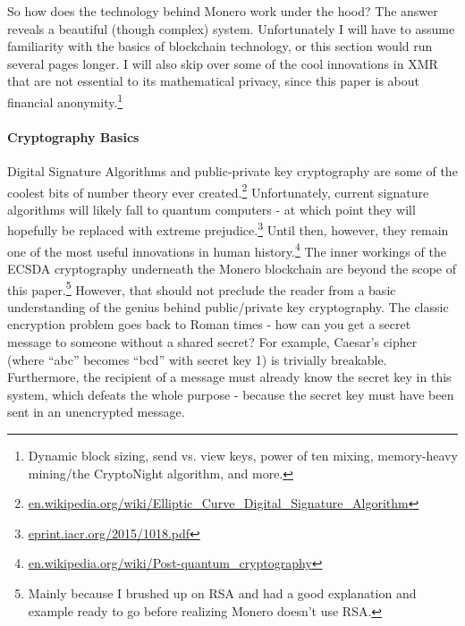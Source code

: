 \documentclass[12pt]{article}
\begin{document}



So how does the technology behind Monero work under the hood? The answer reveals a beautiful (though complex) system. Unfortunately I will have to assume familiarity with the basics of blockchain technology, or this section would run several pages longer. I will also skip over some of the cool innovations in XMR that are not essential to its mathematical privacy, since this paper is about financial anonymity.\footnote{Dynamic block sizing, send vs. view keys, power of ten mixing, memory-heavy mining/the CryptoNight algorithm, and more.}

\paragraph{Cryptography Basics} Digital Signature Algorithms and public-private key cryptography are some of the coolest bits of number theory ever created.\footnote{\url{en.wikipedia.org/wiki/Elliptic_Curve_Digital_Signature_Algorithm}} Unfortunately, current signature algorithms will likely fall to quantum computers - at which point they will hopefully be replaced with extreme 
prejudice.\footnote{\url{eprint.iacr.org/2015/1018.pdf}} Until then, however, they remain one of the most useful innovations in human 
history.\footnote{\url{en.wikipedia.org/wiki/Post-quantum_cryptography}}
The inner workings of the ECSDA cryptography underneath the Monero blockchain are beyond the scope of this paper.\footnote{Mainly because I brushed up on RSA and had a good explanation and example ready to go before realizing Monero doesn't use RSA.} However, that should not preclude the reader from a basic understanding of the genius behind public/private key cryptography. The classic encryption problem goes back to Roman times - how can you get a secret message to someone without a shared secret? For example, Caesar's cipher (where ``abc'' becomes ``bcd'' with secret key 1) is trivially breakable. Furthermore, the recipient of a message must already know the secret key in this system, which defeats the whole purpose - because the secret key must have been sent in an unencrypted message.
\end{document}
